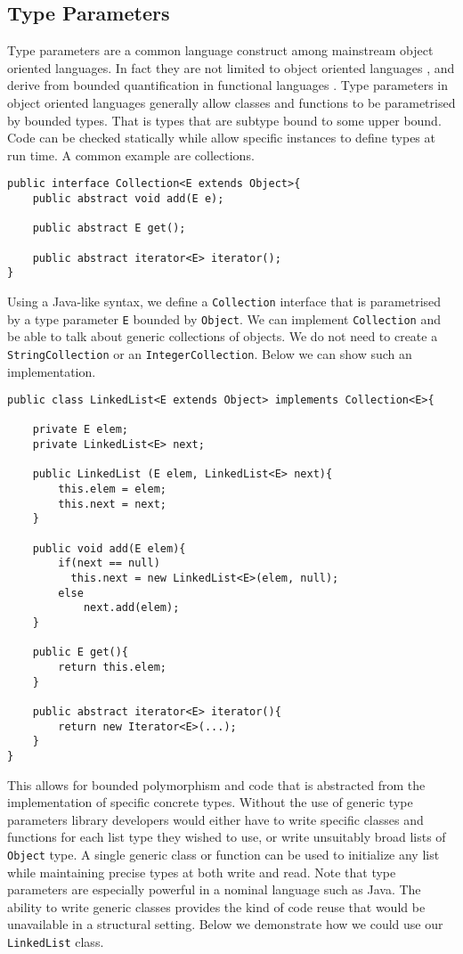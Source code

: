 \documentclass[11pt
              , a4paper
              , twoside
              , openright
              ]{report}
\numberwithin{case}{theorem}
\numberwithin{subcase}{case}
\begin{document}
\subsection{Type Parameters}
Type parameters are a common language construct among mainstream object oriented languages. In fact they are not limited to object oriented languages \cite{Gosling:2014:JLS:2636997, Hejlsberg:2010:CPL:1951915, Stroustrup:2000:CPL:518791, scaladocs2016}, and derive from bounded quantification in functional languages \cite{Canning:1989:FPO:99370.99392, Cardelli:1985:UTD:6041.6042}. Type parameters in object oriented languages generally allow classes and functions to be parametrised by bounded types. That is types that are subtype bound to some upper bound. Code can be checked statically while allow specific instances to define types at run time. A common example are collections.
\begin{lstlisting}[mathescape, style=customlang]
public interface Collection<E extends Object>{
	public abstract void add(E e);
	
	public abstract E get();
	
	public abstract iterator<E> iterator();
}
\end{lstlisting}
Using a Java-like syntax, we define a \verb|Collection| interface that is parametrised by a type parameter \verb|E| bounded by \verb|Object|. We can implement \verb|Collection| and be able to talk about generic collections of objects. We do not need to create a \verb|StringCollection| or an \verb|IntegerCollection|. Below we can show such an implementation.
\begin{lstlisting}[mathescape, style=customlang]
public class LinkedList<E extends Object> implements Collection<E>{

	private E elem;
	private LinkedList<E> next;
	
	public LinkedList (E elem, LinkedList<E> next){
		this.elem = elem;
		this.next = next;
	}
	
	public void add(E elem){
		if(next == null)
		  this.next = new LinkedList<E>(elem, null);
		else
			next.add(elem);
	}
	
	public E get(){
		return this.elem;
	}
	
	public abstract iterator<E> iterator(){
		return new Iterator<E>(...);
	}
}
\end{lstlisting}
This allows for bounded polymorphism and code that is abstracted from the implementation of specific concrete types. Without the use of generic type parameters library developers would either have to write specific classes and functions for each list type they wished to use, or write unsuitably broad lists of \verb|Object| type. A single generic class or function can be used to initialize any list while maintaining precise types at both write and read. Note that type parameters are especially powerful in a nominal language such as Java. The ability to write generic classes provides the kind of code reuse that would be unavailable in a structural setting. Below we demonstrate how we could use our \verb|LinkedList| class.
\end{document}
